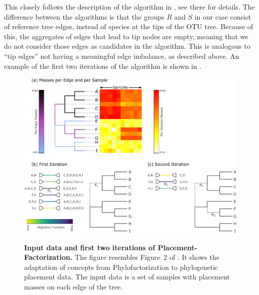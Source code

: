 This closely follows the description of the algorithm in \cite{Washburne2018,Washburne2019}, see there for details.
The difference between the algorithms is that the groups $R$ and $S$ in our case consist of reference tree edges,
instead of species at the tips of the OTU tree.
Because of this, the aggregates of edges that lead to tip nodes are empty,
meaning that we do not consider those edges as candidates in the algorithm.
This is analogous to ``tip edges'' not having a meaningful edge imbalance, as described above.
An example of the first two iterations of the algorithm is shown in .

\begin{figure}[!htb]
    \centering
    \includegraphics[width=\linewidth]{pdf/phylofactor.pdf}
    \begin{subfigure}{0pt}
        \label{fig:phylofactor:sub:heat_tree}
    \end{subfigure}
    \begin{subfigure}{0pt}
        \label{fig:phylofactor:sub:first}
    \end{subfigure}
    \begin{subfigure}{0pt}
        \label{fig:phylofactor:sub:second}
    \end{subfigure}
    \caption{
        \textbf{Input data and first two iterations of Placement-Factorization.}
        The figure resembles Figure~2 of \cite{Washburne2017a}.
        It shows the adaptation of concepts from Phylofactorization to phylogenetic placement data.
        The input data is a set of samples with placement masses on each edge of the tree.
}
\end{figure}
